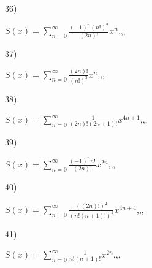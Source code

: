 \documentclass[11pt, ukrainian]{article}
\begin{document}
\par
\vspace{0.9cm}
36) \space 
{%
{$S(x)=\sum\limits_{n=0}^{\infty}{\frac{{(-1)^n}{(n!)^2}}{(2n)!}}{x^{{n}}}$},,, \par \smallskip  
}
\par
\vspace{0.9cm}
37) \space 
{%
{$S(x)=\sum\limits_{n=0}^{\infty}{\frac{(2n)!}{(n!)^3}}{x^{{n}}}$},,, \par \smallskip  
}
\par
\vspace{0.9cm}
38) \space 
{%
{$S(x)=\sum\limits_{n=0}^{\infty}{\frac{1}{(2n)!(2n+1)!}}{x^{{4n+1}}}$},,, \par \smallskip  
}
\par
\vspace{0.9cm}
39) \space 
{%
{$S(x)=\sum\limits_{n=0}^{\infty}{\frac{{(-1)^n}{n!}}{(2n)!}}{x^{{2n}}}$},,, \par \smallskip  
}
\par
\vspace{0.9cm}
40) \space 
{%
{$S(x)=\sum\limits_{n=0}^{\infty}{\frac{((2n)!)^2}{(n!(n+1)!)^2}}{x^{{4n+4}}}$},,, \par \smallskip  
}
\par
\newpage
41) \space 
{%
{$S(x)=\sum\limits_{n=0}^{\infty}{\frac{1}{n!(n+1)!}}{x^{{2n}}}$},,, \par \smallskip  
}
\end{document}
